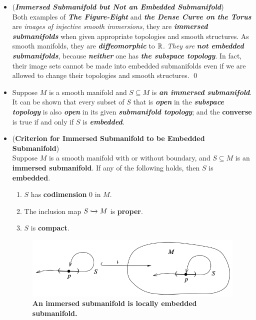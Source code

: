 \documentclass[11pt]{article}
\begin{document}
\begin{itemize}
\item \begin{example} (\emph{\textbf{Immersed Submanifold but Not an Embedded Submanifold}})\\
Both examples of \emph{\textbf{The Figure-Eight}} and \emph{\textbf{the Dense Curve on the Torus}} are \emph{images of injective smooth immersions}, they are \emph{\textbf{immersed submanifolds}} when given appropriate topologies and smooth structures. As smooth manifolds, they are \emph{\textbf{diffeomorphic}} to ${\mathbb R}$. \emph{They are \textbf{not embedded submanifolds}}, because \emph{\textbf{neither}} one has \emph{\textbf{the subspace topology}}. In fact, their image sets cannot be made into embedded submanifolds even if we are allowed to change their topologies and smooth structures. \qed
\end{example}

\item \begin{remark}
Suppose $M$ is a smooth manifold and $S \subseteq M$ is \emph{\textbf{an immersed submanifold}}. It can be shown that every subset of $S$ that is \emph{\textbf{open}} in the \emph{\textbf{subspace topology}} is also \emph{\textbf{open}} in its given \emph{\textbf{submanifold topology}}; and the \textbf{converse} is true if and only if $S$ is \textbf{\emph{embedded}}.
\end{remark}

\item \begin{proposition} (\textbf{Criterion for Immersed Submanifold to be Embedded Submanifold})\\
Suppose $M$ is a smooth manifold with or without boundary, and $S \subseteq M$ is an \textbf{immersed submanifold}. If any of the following holds, then $S$ is \textbf{embedded}.
\begin{enumerate}
\item $S$ has \textbf{codimension} $0$ in $M$.
\item The inclusion map $S \xhookrightarrow{} M$ is \textbf{proper}.
\item  $S$ is \textbf{compact}.
\end{enumerate}
\end{proposition}

\begin{figure}
\begin{minipage}[htb]{1\linewidth}
  \centering
  \centerline{\includegraphics[scale = 0.4]{immersed_subman_locally_embedded.png}}
\end{minipage}
\caption{\footnotesize{\textbf{An immersed submanifold is locally embedded submanifold. \citep{lee2003introduction}}}}
\label{fig: immersed_subman_locally_embedded}
\end{figure}




\end{itemize}
\end{document}
